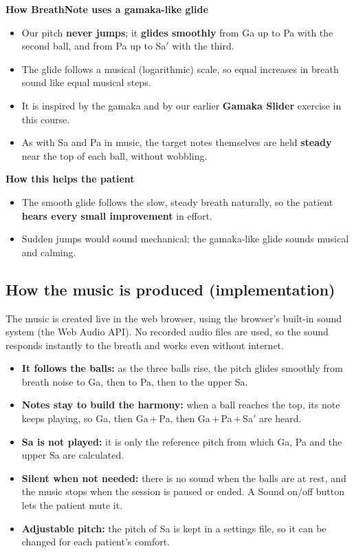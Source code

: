\documentclass[12pt,a4paper]{article}
\newcommand{\Sah}{Sa\ensuremath{'}}     %
\begin{document}
\textbf{How BreathNote uses a gamaka-like glide}
\begin{itemize}
  \item Our pitch \textbf{never jumps}; it \textbf{glides smoothly} from Ga up to Pa with the second ball, and from Pa up to \Sah{} with the third.
  \item The glide follows a musical (logarithmic) scale, so equal increases in breath sound like equal musical steps.
  \item It is inspired by the gamaka and by our earlier \textbf{Gamaka Slider} exercise in this course.
  \item As with Sa and Pa in music, the target notes themselves are held \textbf{steady} near the top of each ball, without wobbling.
\end{itemize}

\textbf{How this helps the patient}
\begin{itemize}
  \item The smooth glide follows the slow, steady breath naturally, so the patient \textbf{hears every small improvement} in effort.
  \item Sudden jumps would sound mechanical; the gamaka-like glide sounds musical and calming.
\end{itemize}

\subsection{How the music is produced (implementation)}
\label{sec:music-impl}

The music is created live in the web browser, using the browser's built-in sound system (the Web Audio API). No recorded audio files are used, so the sound responds instantly to the breath and works even without internet.
\begin{itemize}
  \item \textbf{It follows the balls:} as the three balls rise, the pitch glides smoothly from breath noise to Ga, then to Pa, then to the upper Sa.
  \item \textbf{Notes stay to build the harmony:} when a ball reaches the top, its note keeps playing, so Ga, then Ga\,+\,Pa, then Ga\,+\,Pa\,+\,\Sah{} are heard.
  \item \textbf{Sa is not played:} it is only the reference pitch from which Ga, Pa and the upper Sa are calculated.
  \item \textbf{Silent when not needed:} there is no sound when the balls are at rest, and the music stops when the session is paused or ended. A Sound on/off button lets the patient mute it.
  \item \textbf{Adjustable pitch:} the pitch of Sa is kept in a settings file, so it can be changed for each patient's comfort.
\end{itemize}
\end{document}

